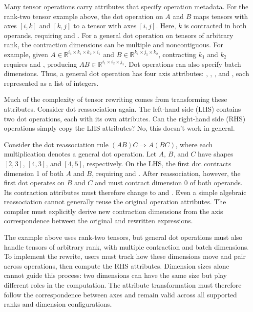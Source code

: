 Many tensor operations carry attributes that specify operation metadata.
For the rank-two tensor example above, the dot operation on $A$ and $B$
maps tensors with axes $[i,k]$ and $[k,j]$ to a tensor with axes $[i,j]$.
Here, $k$ is contracted in both operands, requiring
 and .
For a general dot operation on tensors of arbitrary rank, the contraction
dimensions can be multiple and noncontiguous. For example, given
$A\in\mathbb{R}^{i_1\times k_1\times k_2\times i_2}$ and
$B\in\mathbb{R}^{k_1\times j_1\times k_2}$, contracting $k_1$ and $k_2$
requires  and
, producing
$AB\in\mathbb{R}^{i_1\times i_2\times j_1}$.
Dot operations can also specify batch dimensions. Thus, a general dot
operation has four axis attributes:
, ,
, and ,
each represented as a list of integers.

Much of the complexity of tensor rewriting comes from transforming these
attributes. Consider dot reassociation again. The left-hand side (LHS)
contains two dot operations, each with its own attributes.
Can the right-hand side (RHS) operations simply copy the LHS attributes?
No, this doesn't work in general.

Consider the dot reassociation rule $(AB)C \Rightarrow A(BC)$, where each
multiplication denotes a general dot operation. Let $A$, $B$, and $C$ have
shapes $[2,3]$, $[4,3]$, and $[4,5]$, respectively.
On the LHS, the first dot contracts dimension 1 of both $A$
and $B$, requiring  and
. After reassociation, however, the first dot
operates on $B$ and $C$ and must contract dimension 0 of both operands.
Its contraction attributes must therefore change to \code{[0]} and
\code{[0]}. Even a simple algebraic reassociation cannot generally reuse
the original operation attributes. The compiler must explicitly derive new
contraction dimensions from the axis correspondence between the original
and rewritten expressions.

The example above uses rank-two tensors, but general dot operations must
also handle tensors of arbitrary rank, with multiple contraction and batch
dimensions. To implement the rewrite, users must track how these dimensions
move and pair across operations, then compute the RHS attributes.
Dimension sizes alone cannot guide this process: two dimensions can have
the same size but play different roles in the computation.
The attribute transformation must therefore follow the correspondence
between axes and remain valid across all supported ranks and dimension
configurations.

